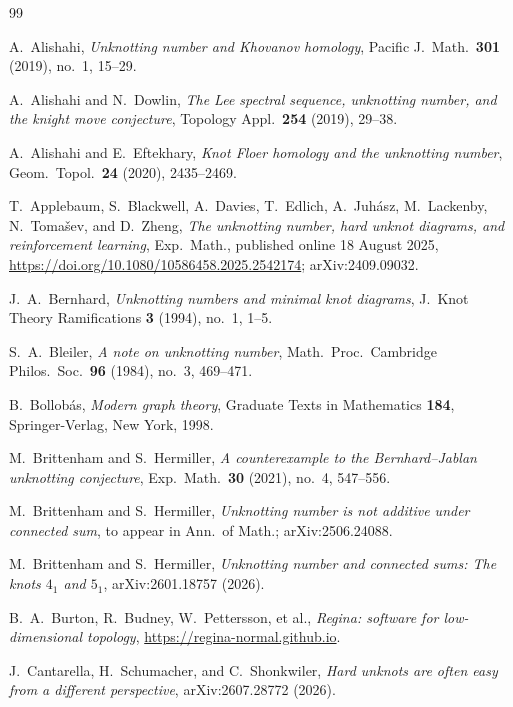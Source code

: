 \documentclass[12pt, oneside]{amsart}
\begin{document}
\clearpage
\begin{thebibliography}{99}

     A.~Alishahi, \emph{Unknotting number and Khovanov homology},
    Pacific J.\ Math.\ \textbf{301} (2019), no.~1, 15--29.

     A.~Alishahi and N.~Dowlin, \emph{The Lee spectral sequence, unknotting number,
        and the knight move conjecture}, Topology Appl.\ \textbf{254} (2019), 29--38.

     A.~Alishahi and E.~Eftekhary, \emph{Knot Floer homology and the unknotting
        number}, Geom.\ Topol.\ \textbf{24} (2020), 2435--2469.

     T.~Applebaum, S.~Blackwell, A.~Davies, T.~Edlich, A.~Juh\'asz,
    M.~Lackenby, N.~Toma\v{s}ev, and D.~Zheng, \emph{The unknotting number, hard unknot diagrams,
        and reinforcement learning}, Exp.\ Math., published online 18 August 2025,
    \url{https://doi.org/10.1080/10586458.2025.2542174}; arXiv:2409.09032.

     J.~A.~Bernhard, \emph{Unknotting numbers and minimal knot diagrams},
    J.~Knot Theory Ramifications \textbf{3} (1994), no.~1, 1--5.

     S.~A.~Bleiler, \emph{A note on unknotting number}, Math.\ Proc.\ Cambridge
    Philos.\ Soc.\ \textbf{96} (1984), no.~3, 469--471.

     B.~Bollob\'as, \emph{Modern graph theory}, Graduate Texts in Mathematics
    \textbf{184}, Springer-Verlag, New York, 1998.

     M.~Brittenham and S.~Hermiller, \emph{A counterexample to the
        Bernhard--Jablan unknotting conjecture}, Exp.\ Math.\ \textbf{30} (2021), no.~4,
    547--556.

     M.~Brittenham and S.~Hermiller, \emph{Unknotting number is not additive under
        connected sum}, to appear in Ann.\ of Math.; arXiv:2506.24088.

     M.~Brittenham and S.~Hermiller,
    \emph{Unknotting number and connected sums: The knots $4_1$ and $5_1$},
    arXiv:2601.18757 (2026).

     B.~A.~Burton, R.~Budney, W.~Pettersson, et al., \emph{Regina: software for
        low-dimensional topology}, \url{https://regina-normal.github.io}.

     J.~Cantarella, H.~Schumacher, and C.~Shonkwiler, \emph{Hard unknots are often
        easy from a different perspective}, arXiv:2607.28772 (2026).


\end{thebibliography}
\end{document}
